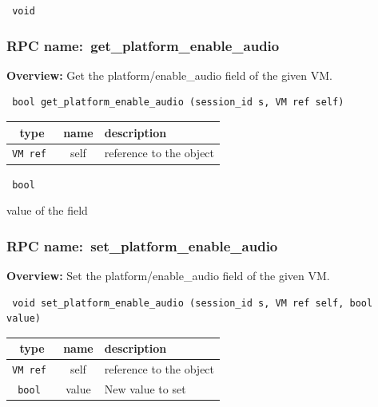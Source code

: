 \vspace{0.3cm}

{\tt 
void
}



\vspace{0.3cm}
\vspace{0.3cm}
\vspace{0.3cm}
\subsubsection{RPC name:~get\_platform\_enable\_audio}

{\bf Overview:} 
Get the platform/enable\_audio field of the given VM.

\begin{verbatim} bool get_platform_enable_audio (session_id s, VM ref self)\end{verbatim}



 
\vspace{0.3cm}
\begin{tabular}{|c|c|p{7cm}|}
 \hline
{\bf type} & {\bf name} & {\bf description} \\ \hline
{\tt VM ref } & self & reference to the object \\ \hline 

\end{tabular}

\vspace{0.3cm}

{\tt 
bool
}


value of the field
\vspace{0.3cm}
\vspace{0.3cm}
\vspace{0.3cm}
\subsubsection{RPC name:~set\_platform\_enable\_audio}

{\bf Overview:} 
Set the platform/enable\_audio field of the given VM.

\begin{verbatim} void set_platform_enable_audio (session_id s, VM ref self, bool value)\end{verbatim}



 
\vspace{0.3cm}
\begin{tabular}{|c|c|p{7cm}|}
 \hline
{\bf type} & {\bf name} & {\bf description} \\ \hline
{\tt VM ref } & self & reference to the object \\ \hline 

{\tt bool } & value & New value to set \\ \hline 

\end{tabular}

